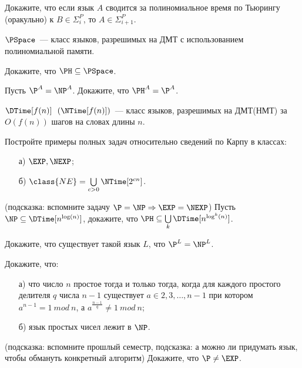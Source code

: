

\begin{task}
	Докажите, что если язык $A$ сводится за полиномиальное время по Тьюрингу (оракульно) к $B \in \Sigma_i^P$, то $A \in
    \Sigma_{i + 1}^P$.    
\end{task}


$\PSpace$~--- класс языков, разрешимых на ДМТ с использованием полиномиальной памяти.

\begin{task}
    Докажите, что $\PH \subseteq \PSpace$.
\end{task}

\begin{task}
    Пусть $\P^{A} = \NP^{A}$. Докажите, что $\PH^{A} = \P^{A}$.
\end{task}

$\DTime[f(n)]~~(\NTime[f(n)]) $~--- класс языков, разрешимых на ДМТ(НМТ) за $O(f(n))$ шагов на словах длины $n$.

\begin{task}
	Постройте примеры полных задач относительно сведений по Карпу в классах:
    \begin{enumerate}[topsep = 0pt, itemsep = -1ex]
        \item [а)] $\EXP, \NEXP$;
        \item [б)] $\class{NE} = \bigcup\limits_{c > 0} \NTime[2^{cn}]$.
	\end{enumerate}
\end{task}

\begin{task}(подсказка: вспомните задачу $\P = \NP \Rightarrow \EXP = \NEXP$)
    Пусть $\NP \subseteq \DTime[n^{\log(n)}]$, докажите, что $\PH \subseteq \bigcup\limits_{k} \DTime[n^{\log^k(n)}]$.
\end{task}

\begin{task}
    Докажите, что существует такой язык $L$, что $\P^{L} = \NP^{L}$.
\end{task}




\breakline


\begin{ptask}{10}
    Докажите, что:
   	\begin{enumerate}[topsep = 0pt, itemsep = -1ex]
        \item [а)] что число $n$ простое тогда и только тогда, когда для каждого простого делителя $q$ числа $n - 1$ существует $a
            \in {2, 3, \dots, n - 1}$ при котором $a^{n - 1} = 1~mod~n$, а $a^{\frac{n - 1}{q}} \ne 1~mod~n$;
        \item [б)] язык простых чисел лежит в $\NP$.
	\end{enumerate}
\end{ptask}


\begin{ptask}{16} (подсказка: вспомните прошлый семестр, подсказка: а можно ли придумать язык, чтобы обмануть конкретный алгоритм)
    Докажите, что $\P \neq \EXP$.
\end{ptask}

